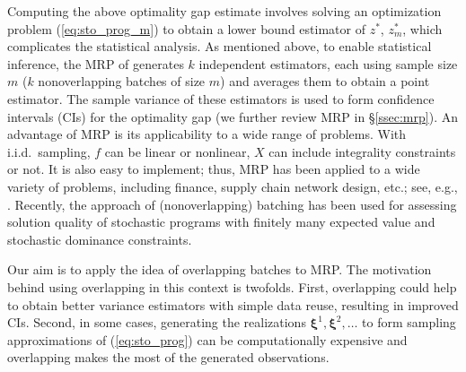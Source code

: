 \documentclass[12pt]{article}
\newcommand{\X}{X}
\newcommand{\x}{\mathbf{x}}
\newcommand{\xh}{{\hat{\x}}}
\newcommand{\xit}{\boldsymbol{\xi}}
\newcommand{\zs}{z^*}
\begin{document}
Computing the above optimality gap estimate involves solving an optimization problem (\ref{eq:sto_prog_m}) to obtain a lower bound estimator of $\zs$, $\zs_m$, which complicates the statistical analysis. 
As mentioned above, to enable statistical inference, the MRP of \citet{Mak1999} generates $k$ independent estimators, each using sample size $m$ ($k$ nonoverlapping batches of size $m$) and averages them to obtain a point estimator.  
The sample variance of these estimators is used to form confidence intervals (CIs) for the optimality gap (we further review MRP in \S \ref{ssec:mrp}).  
An advantage of MRP is its applicability to a wide range of problems.  
With i.i.d.\ sampling, $f$ can be linear or nonlinear, $\X$ can include integrality constraints or not.  
It is also easy to implement; thus, MRP has been applied to a wide variety of problems, including finance, supply chain network design, etc.; see, e.g., \citep{bertocchi_etal_99,janjarassuk_linderoth_08,santoso_ahmed_etal_05}.  
Recently, the approach of (nonoverlapping) batching has been used for assessing solution quality of stochastic programs with finitely many expected value \citep{wang_ahmed_08} and stochastic dominance \citep{hu2010sample} constraints.



Our aim is to apply the idea of overlapping batches to MRP.  
The motivation behind using overlapping in this context is twofolds. 
First, overlapping could help to obtain better variance estimators with simple data reuse, resulting in improved CIs.
Second, in some cases, generating the realizations $\xit^1, \xit^2, \dots$ to form sampling approximations of (\ref{eq:sto_prog}) can be computationally expensive and overlapping makes the most of the generated observations. 
\end{document}
